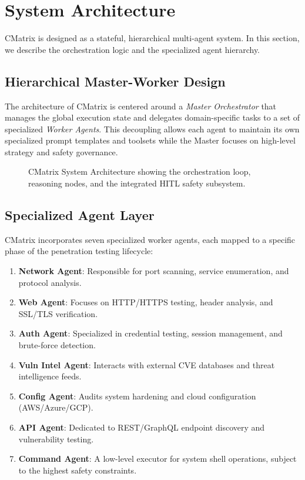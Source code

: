 \section{System Architecture}
\label{sec:architecture}

CMatrix is designed as a stateful, hierarchical multi-agent system. In this section, we describe the orchestration logic and the specialized agent hierarchy.

\subsection{Hierarchical Master-Worker Design}
The architecture of CMatrix is centered around a \textit{Master Orchestrator} that manages the global execution state and delegates domain-specific tasks to a set of specialized \textit{Worker Agents}. This decoupling allows each agent to maintain its own specialized prompt templates and toolsets while the Master focuses on high-level strategy and safety governance.

\begin{figure}[t]
\centering

\caption{CMatrix System Architecture showing the orchestration loop, reasoning nodes, and the integrated HITL safety subsystem.}
\label{fig:architecture}
\end{figure}

\subsection{Specialized Agent Layer}
CMatrix incorporates seven specialized worker agents, each mapped to a specific phase of the penetration testing lifecycle:
\begin{enumerate}
    \item \textbf{Network Agent}: Responsible for port scanning, service enumeration, and protocol analysis.
    \item \textbf{Web Agent}: Focuses on HTTP/HTTPS testing, header analysis, and SSL/TLS verification.
    \item \textbf{Auth Agent}: Specialized in credential testing, session management, and brute-force detection.
    \item \textbf{Vuln Intel Agent}: Interacts with external CVE databases and threat intelligence feeds.
    \item \textbf{Config Agent}: Audits system hardening and cloud configuration (AWS/Azure/GCP).
    \item \textbf{API Agent}: Dedicated to REST/GraphQL endpoint discovery and vulnerability testing.
    \item \textbf{Command Agent}: A low-level executor for system shell operations, subject to the highest safety constraints.
\end{enumerate}

